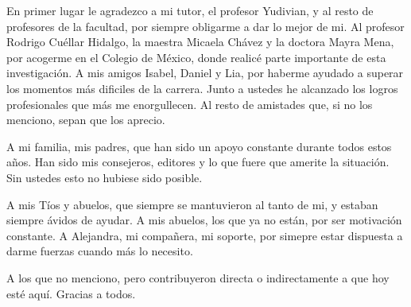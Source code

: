 \begin{acknowledgements}
    En primer lugar le agradezco a mi tutor, el profesor Yudivian, y al resto de profesores de la facultad, por siempre obligarme a dar lo mejor de mi. Al profesor Rodrigo Cuéllar Hidalgo, la maestra Micaela Chávez y la doctora Mayra Mena, por acogerme en el Colegio de México, donde realicé parte importante de esta investigación.
    A mis amigos Isabel, Daniel y Lia, por haberme ayudado a superar los momentos más dificiles de la carrera. Junto a ustedes he alcanzado los logros profesionales que más me enorgullecen. Al resto de amistades que, si no los menciono, sepan que los aprecio.

    A mi familia, mis padres, que han sido un apoyo constante durante todos estos años. Han sido mis consejeros, editores y lo que fuere que amerite la situación. Sin ustedes esto no hubiese sido posible.
    
    A mis Tíos y abuelos, que siempre se mantuvieron al tanto de mi, y estaban siempre ávidos de ayudar. A mis abuelos, los que ya no están, por ser motivación constante. A Alejandra, mi compañera, mi soporte, por simepre estar dispuesta a darme fuerzas cuando más lo necesito.

    A los que no menciono, pero contribuyeron directa o indirectamente a que hoy esté aquí. Gracias a todos.
\end{acknowledgements}